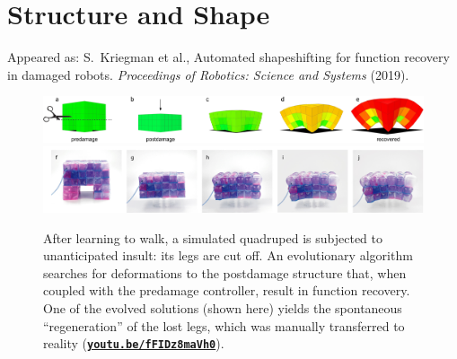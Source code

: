 
\chapter{Structure and Shape}

\vspace{-2.5em}

{\footnotesize
\noindent
Appeared as:
S.~Kriegman et al., Automated shapeshifting for function recovery in damaged robots. \textit{Proceedings of Robotics: Science and Systems} (2019).
}

\vspace{0.5em}

\begin{figure}[!h]
    \centering
    \includegraphics[width=\linewidth]{Chapter05/fig/bigger_teaser.jpg} \\
    \includegraphics[trim={0 0 0 4pt},clip,width=\linewidth]{Chapter05/fig/VoxelBotCropped.jpg} \\
    \caption{After learning to walk, a simulated quadruped is subjected to unanticipated insult: its legs are cut off. 
    An evolutionary algorithm searches for deformations to the postdamage structure that, when coupled with the predamage controller, result in function recovery.
    One of the evolved solutions (shown here) yields the spontaneous ``regeneration'' of the lost legs, which was manually transferred to reality 
    (\href{https://youtu.be/fFIDz8maVh0}{\textbf{\texttt{youtu.be/fFIDz8maVh0}}}).
    } 
    \label{fig:teaser}
\end{figure}









% 

% 

% 

% 